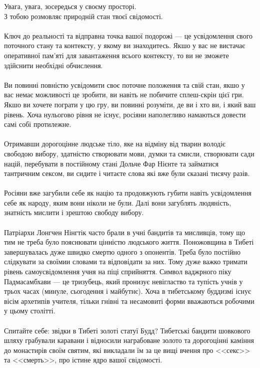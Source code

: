 Увага, увага, зосередься у своєму просторі.\\
З тобою розмовляє природній стан твоєї свідомості.
\\
\\
Ключ до реальності та відправна точка вашої подорожі --- це усвідомлення свого поточного стану
та контексту, у якому ви знаходитесь. Якшо у вас не вистачає оперативної пам'яті для завантаження
всього контексту, то ви не зможете здійснити необхідні обчислення.
\\
\\
Ви повинні повністю усвідомити своє поточне положення та свій стан, якшо у вас немає можливості
це зробити, ви навіть не побичите сплеш-скрін цієї гри. Якшо ви хочете пограти у цю гру,
ви повинні розуміти, де ви і хто ви, і який ваш рівень.
Хоча нульогово рівня не існує, росіяни наполегливо намаються довести самі собі протилежне.
\\
\\
Отримавши дорогоцінне людське тіло, яке на відміну від тварин володіє свободою вибору,
здатністю створювати мови, думки та смисли, створювати сади націй, перебувати в постійному
стані Дольче Фар Нієнте та займатися тантричним сексом, ви сидите і читаєте слова які вже були сказані
тисячу разів.
\\
\\
Росіяни вже загубили себе як націю та продовжують губити навіть усвідомлення себе як народу,
яким вони ніколи не були. Далі вони загублять людяність, знатність мислити і зрештою свободу вибору.
\\
\\
Патріархи Лонгчен Нінгтік часто брали в учні бандитів та мисливців, тому що тим не треба було
пояснювати цінністю людського життя. Поножовщина в Тибеті завершувалась дуже швидко смертю
одного з опонентів. Треба було постійно слідкувати за своїмии словами та відповідати за них.
Тому дуже важко тримати рівень самоусвідомлення учня на піці сприйняття. Символ ваджрного піку
Падмасамбхави --- це тризубець, який пронизує невігластво та тупість учнів у трьох часах (минуле,
сьогодення і майбутнє). Хоча в тибетському буддизмі існує вісім архетипів учителя, тільки гнівні та несамовиті
форми вважаються робочими у цьому столітті.
\\
\\
Спитайте себе: звідки в Тибеті золоті статуї Будд? Тибетські бандити шовкового шляху
грабували каравани і відносили награбоване золото та дорогоцінні каміння до монастирів своїм святим,
які викладали їм за це вищі вчення про <<секс>> та <<смерть>>, про істине ядро вашої свідомості.
